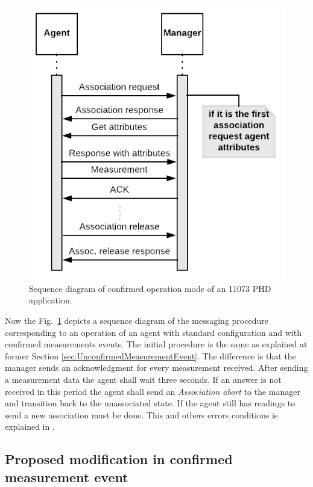 \begin{figure}[htbp]
\centerline{\includegraphics[scale=0.35]{figures/confirmed.png}}
\caption{Sequence diagram of confirmed operation mode of an 11073 PHD application.}
\label{fig:confirmedMode}
\end{figure}

Now the Fig.~\ref{fig:confirmedMode} depicts a sequence diagram of the messaging procedure corresponding to an operation of an agent with standard configuration and with confirmed measurements events. The initial procedure is the same as explained at former Section \ref{sec:UnconfirmedMeasurementEvent}. The difference is that the manager sends an acknowledgment for every measurement received. After sending a measurement data the agent shall wait three seconds. If an answer is not received in this period the agent shall send an \textit{Association abort} to the manager and transition back to the unassociated state. If the agent still has readings to send a new association must be done. This and others errors conditions is explained in \cite{b1}.

\subsection{Proposed modification in confirmed measurement event}

